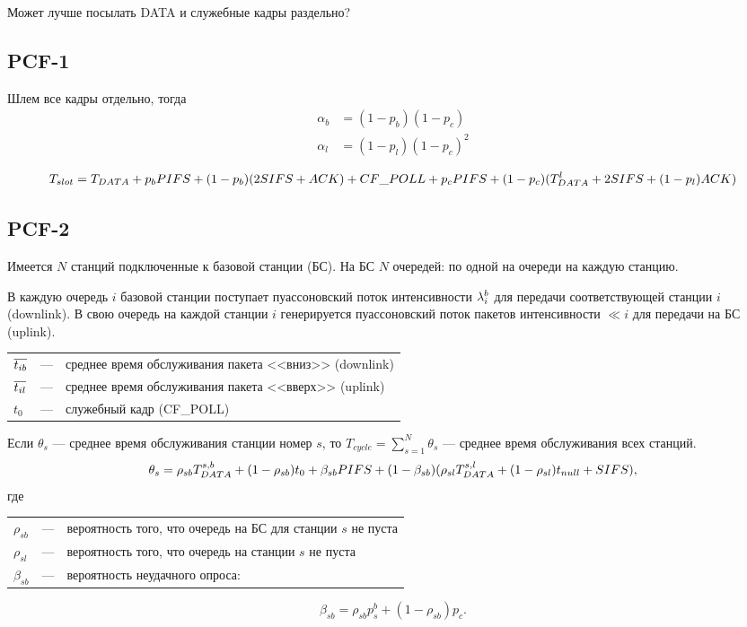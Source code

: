 Может лучше посылать DATA и служебные кадры раздельно?

\subsection{PCF-1}
Шлем все кадры отдельно, тогда 
\begin{align*}
\alpha_b &= (1-p_b)(1-p_c)\\
\alpha_l &= (1-p_l)(1-p_c)^2
\end{align*}

\begin{equation}
\notag
T_{slot} = T_{DATA} + p_b PIFS + (1-p_b)(2SIFS + ACK) + CF\_POLL + p_c PIFS + (1-p_c)(T_{DATA}^l + 2SIFS + (1-p_l)ACK)
\end{equation}

\subsection{PCF-2}
Имеется $N$ станций подключенные к базовой станции (БС). На БС $N$ очередей: по одной на очереди на каждую станцию. 

В каждую очередь $i$ базовой станции поступает пуассоновский поток интенсивности $\lambda^{b}_{i}$ для передачи соответствующей станции $i$ (downlink). В свою очередь на каждой станции $i$ генерируется пуассоновский поток пакетов интенсивности $\ll{i}$ для передачи на БС (uplink). 

\begin{tabular}{l l l}
$\overline{t_{i b}}$ 	&---	&среднее время обслуживания пакета <<вниз>>  (downlink) \\
$\overline{t_{i l}}$	&---	&среднее время обслуживания пакета <<вверх>> (uplink)   \\
$t_0$		&---	&служебный кадр (CF\_POLL) \\
\end{tabular}

Если $\theta_s$ --- среднее время обслуживания станции номер $s$, то 
$T_{cycle} = \sum\limits_{s = 1}^{N} \theta_s$ --- среднее время обслуживания всех станций.
\begin{equation}
\notag
\theta_s = \rho_{sb} T_{DATA}^{s,b} + (1 - \rho_{sb})t_0 + \beta_{sb} PIFS + (1-\beta_{sb})(\rho_{sl}T_{DATA}^{s,l} + (1- \rho_{sl})t_{null} + SIFS),
\end{equation}
где  

\begin{tabular}{l l l}
$\rho_{sb}$ 	&---	&вероятность того, что очередь на БС для станции $s$ не пуста \\
$\rho_{sl}$		&---	&вероятность того, что очередь на станции $s$ не пуста  \\
$\beta_{sb}$	&---	&вероятность неудачного опроса:\\
\end{tabular}
\begin{equation}
\beta_{sb} = \rho_{sb} p^b_s + (1 - \rho_{sb})p_c.
\end{equation}


